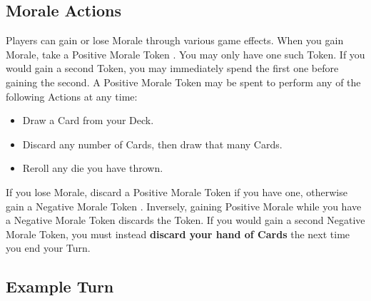 \begin{multicols}{2}
\subsection*{Morale Actions}
Players can gain or lose Morale through various game effects.
When you gain Morale, take a Positive Morale Token .
You may only have one such Token.
If you would gain a second Token, you may immediately spend the first one before gaining the second.
A Positive Morale Token may be spent to perform any of the following Actions at any time:
\begin{itemize}
  \item Draw a Card from your Deck.
  \item Discard any number of Cards, then draw that many Cards.
  \item Reroll any die you have thrown.
\end{itemize}
If you lose Morale, discard a Positive Morale Token  if you have one, otherwise gain a Negative Morale Token .
Inversely, gaining Positive Morale while you have a Negative Morale Token discards the Token.
If you would gain a second Negative Morale Token, you must instead \textbf{discard your hand of Cards} the next time you end your Turn.\par


\subsection*{Example Turn}


\end{multicols}
